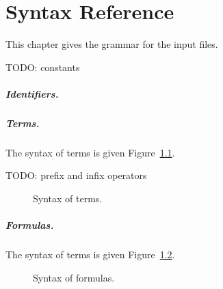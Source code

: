 \chapter{Syntax Reference}
\label{chap:syntaxref}

This chapter gives the grammar for the input files.

TODO: constants

\paragraph{Identifiers.} 
\begin{center}\framebox{}\end{center}

\paragraph{Terms.}
The syntax of terms is given Figure~\ref{fig:bnf:term}.

TODO: prefix and infix operators

\begin{figure}
  \begin{center}\framebox{}\end{center}
  \caption{Syntax of terms.}
\label{fig:bnf:term}
\end{figure}

\paragraph{Formulas.}
The syntax of terms is given Figure~\ref{fig:bnf:formula}.

\begin{figure}
  \begin{center}\framebox{}\end{center}
  \caption{Syntax of formulas.}
\label{fig:bnf:formula}
\end{figure}

